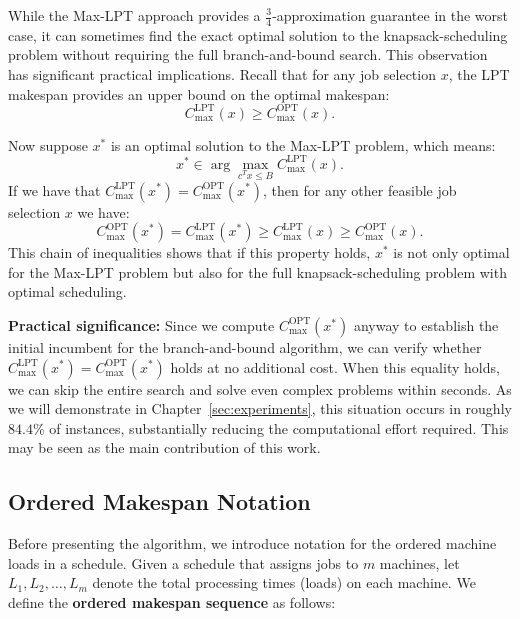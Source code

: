 While the Max-LPT approach provides a $\frac{3}{4}$-approximation guarantee in the worst case, it can sometimes find the exact optimal solution to the knapsack-scheduling problem without requiring the full branch-and-bound search. This observation has significant practical implications.
Recall that for any job selection $x$, the LPT makespan provides an upper bound on the optimal makespan:
\[
C_{\max}^{\text{LPT}}(x) \geq C_{\max}^{\text{OPT}}(x).
\]

Now suppose $x^*$ is an optimal solution to the Max-LPT problem, which means:
\[
x^* \in \arg\max_{c^Tx \leq B} C_{\max}^{\text{LPT}}(x).
\]
If we have that $C_{\max}^{\text{LPT}}(x^*) = C_{\max}^{\text{OPT}}(x^*)$, then for any other feasible job selection $x$ we have:
\[
C_{\max}^{\text{OPT}}(x^*) = C_{\max}^{\text{LPT}}(x^*) \geq C_{\max}^{\text{LPT}}(x) \geq C_{\max}^{\text{OPT}}(x).
\]
This chain of inequalities shows that if this property holds, $x^*$ is not only optimal for the Max-LPT problem but also for the full knapsack-scheduling problem with optimal scheduling.

\textbf{Practical significance:} Since we compute $C_{\max}^{\text{OPT}}(x^*)$ anyway to establish the initial incumbent for the branch-and-bound algorithm, we can verify whether $C_{\max}^{\text{LPT}}(x^*) = C_{\max}^{\text{OPT}}(x^*)$ holds at no additional cost. When this equality holds, we can skip the entire search and solve even complex problems within seconds. As we will demonstrate in Chapter~\ref{sec:experiments}, this situation occurs in roughly $84.4\%$ of instances, substantially reducing the computational effort required. 
This may be seen as the main contribution of this work.

\subsection{Ordered Makespan Notation}

Before presenting the algorithm, we introduce notation for the ordered machine loads in a schedule. Given a schedule that assigns jobs to $m$ machines, let $L_1, L_2, \ldots, L_m$ denote the total processing times (loads) on each machine. We define the \textbf{ordered makespan sequence} as follows:

